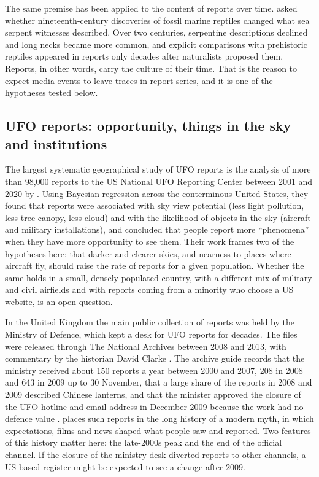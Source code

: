 \documentclass[11pt,a4paper]{article}
\begin{document}
The same premise has been applied to the content of reports over time. \citet{paxton2019} asked whether nineteenth-century discoveries of fossil marine reptiles changed what sea serpent witnesses described. Over two centuries, serpentine descriptions declined and long necks became more common, and explicit comparisons with prehistoric reptiles appeared in reports only decades after naturalists proposed them. Reports, in other words, carry the culture of their time. That is the reason to expect media events to leave traces in report series, and it is one of the hypotheses tested below.

\subsection{UFO reports: opportunity, things in the sky and institutions}
The largest systematic geographical study of UFO reports is the analysis of more than 98,000 reports to the US National UFO Reporting Center between 2001 and 2020 by \citet{medina2023}. Using Bayesian regression across the conterminous United States, they found that reports were associated with sky view potential (less light pollution, less tree canopy, less cloud) and with the likelihood of objects in the sky (aircraft and military installations), and concluded that people report more ``phenomena'' when they have more opportunity to see them. Their work frames two of the hypotheses here: that darker and clearer skies, and nearness to places where aircraft fly, should raise the rate of reports for a given population. Whether the same holds in a small, densely populated country, with a different mix of military and civil airfields and with reports coming from a minority who choose a US website, is an open question.

In the United Kingdom the main public collection of reports was held by the Ministry of Defence, which kept a desk for UFO reports for decades. The files were released through The National Archives between 2008 and 2013, with commentary by the historian David Clarke \citep{clarke2009,tna2013}. The archive guide records that the ministry received about 150 reports a year between 2000 and 2007, 208 in 2008 and 643 in 2009 up to 30 November, that a large share of the reports in 2008 and 2009 described Chinese lanterns, and that the minister approved the closure of the UFO hotline and email address in December 2009 because the work had no defence value \citep{tna2013}. \citet{clarke2015} places such reports in the long history of a modern myth, in which expectations, films and news shaped what people saw and reported. Two features of this history matter here: the late-2000s peak and the end of the official channel. If the closure of the ministry desk diverted reports to other channels, a US-based register might be expected to see a change after 2009.
\end{document}
